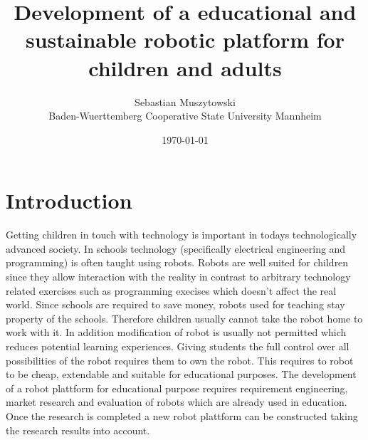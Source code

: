 \documentclass[twocolumn]{article}
\title{Development of a educational and sustainable robotic platform for children and adults}
\date{\today}
\author{Sebastian Muszytowski \\Baden-Wuerttemberg Cooperative State University Mannheim }
\begin{document}
\twocolumn[
        \maketitle
        \begin{@twocolumnfalse}
        \maketitle
        \end{@twocolumnfalse}
]


\section{Introduction}
Getting children in touch with technology is important in todays technologically advanced society. In schools technology (specifically electrical engineering and programming) is often taught using robots. Robots are well suited for children since they allow interaction with the reality in contrast to arbitrary technology related exercises such as programming execises which doesn't affect the real world.\newline 
Since schools are required to save money, robots used for teaching stay property of the schools. Therefore children usually cannot take the robot home to work with it. In addition modification of robot is usually not permitted which reduces potential learning experiences. Giving students the full control over all possibilities of the robot requires them to own the robot. This requires to robot to be cheap, extendable and suitable for educational purposes.\newline
The development of a robot plattform for educational purpose requires requirement engineering, market research and evaluation of robots which are already used in education. Once the research is completed a new robot plattform can be constructed taking the research results into account.
\end{document}

